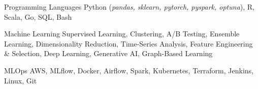 

\begin{cvskills}

  \cvskill
    {Programming Languages}
    {Python (\small\textit{pandas, sklearn, pytorch, pyspark, optuna}), R, Scala, Go, SQL, Bash}

  \cvskill
    {Machine Learning}
    {
      Supervised Learning,
      Clustering,
      A/B Testing,
      Ensemble Learning,
      Dimensionality Reduction,
      Time-Series Analysis,
      Feature Engineering \& Selection,
      Deep Learning,
      Generative AI,
      Graph-Based Learning
    }

  \cvskill
    {MLOps}
    {
      AWS, 
      MLflow,
      Docker, 
      Airflow, 
      Spark, 
      Kubernetes, 
      Terraform, 
      Jenkins, 
      Linux,
      Git
    }


\end{cvskills}
